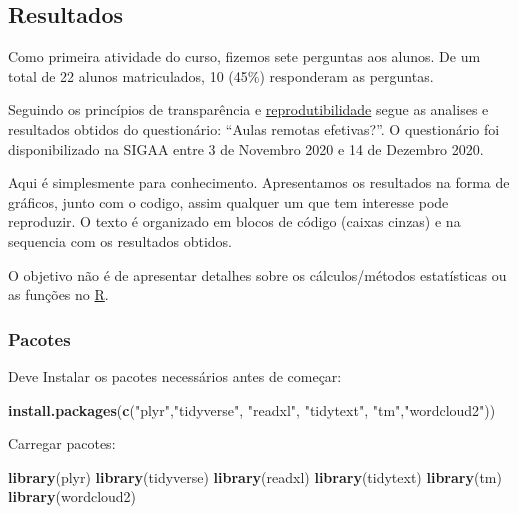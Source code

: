 \documentclass[
]{article}
\newenvironment{Shaded}{\begin{snugshade}}{\end{snugshade}}
\newcommand{\KeywordTok}[1]{\textcolor[rgb]{0.13,0.29,0.53}{\textbf{#1}}}
\newcommand{\NormalTok}[1]{#1}
\newcommand{\StringTok}[1]{\textcolor[rgb]{0.31,0.60,0.02}{#1}}
\begin{document}
\newpage

\hypertarget{resultados}{%
\subsection{Resultados}\label{resultados}}

Como primeira atividade do curso, fizemos sete perguntas aos alunos. De
um total de 22 alunos matriculados, 10 (45\%) responderam as perguntas.

Seguindo os princípios de transparência e
\href{https://book.fosteropenscience.eu/pt/02IntroducaoaCienciaAberta/04Investigacao_reprodutivel_e_analise_de_dados.html}{reprodutibilidade}
segue as analises e resultados obtidos do questionário: ``Aulas remotas
efetivas?''. O questionário foi disponibilizado na SIGAA entre 3 de
Novembro 2020 e 14 de Dezembro 2020.

Aqui é simplesmente para conhecimento. Apresentamos os resultados na
forma de gráficos, junto com o codigo, assim qualquer um que tem
interesse pode reproduzir. O texto é organizado em blocos de código
(caixas cinzas) e na sequencia com os resultados obtidos.

O objetivo não é de apresentar detalhes sobre os cálculos/métodos
estatísticas ou as funções no \href{https://cran.r-project.org/}{R}.

\hypertarget{pacotes}{%
\subsubsection{Pacotes}\label{pacotes}}

Deve Instalar os pacotes necessários antes de começar:

\begin{Shaded}
\begin{Highlighting}[]
\KeywordTok{install.packages}\NormalTok{(}\KeywordTok{c}\NormalTok{(}\StringTok{"plyr"}\NormalTok{,}\StringTok{"tidyverse"}\NormalTok{, }\StringTok{"readxl"}\NormalTok{, }\StringTok{"tidytext"}\NormalTok{, }\StringTok{"tm"}\NormalTok{,}\StringTok{"wordcloud2"}\NormalTok{))}
\end{Highlighting}
\end{Shaded}

Carregar pacotes:

\begin{Shaded}
\begin{Highlighting}[]
\KeywordTok{library}\NormalTok{(plyr)}
\KeywordTok{library}\NormalTok{(tidyverse)}
\KeywordTok{library}\NormalTok{(readxl)}
\KeywordTok{library}\NormalTok{(tidytext)}
\KeywordTok{library}\NormalTok{(tm)}
\KeywordTok{library}\NormalTok{(wordcloud2)}
\end{Highlighting}
\end{Shaded}
\end{document}
